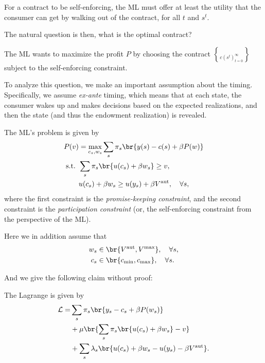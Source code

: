 For a contract to be self-enforcing, the ML must offer at least the utility that the consumer can get by walking out of the contract, for all $t$ and $s^t$.

The natural question is then, what is the optimal contract?

The ML wants to maximize the profit $P$ by choosing the contract $\brace{c(s^t)}_{t=0}^\infty$ subject to the self-enforcing constraint.

To analyze this question, we make an important assumption about the timing. Specifically, we assume \textit{ex-ante} timing, which means that at each state, the consumer wakes up and makes decisions based on the expected realizations, and then the state (and thus the endowment realization) is revealed.

The ML's problem is given by
\[
\begin{aligned}
    P(v) & = \max_{c_s,w_s} \sum_s\pi_s\br{y(s) - c(s)+\beta P(w)}\\
    \text{s.t. } & \sum_s\pi_s\br{u(c_s)+\beta w_s} \ge v,\\
    & u(c_s)+\beta w_s\ge u(y_s)+\beta V^{\text{aut}}, \quad \forall s,
\end{aligned}
\]
where the first constraint is the \textit{promise-keeping constraint}, and the second constraint is the \textit{participation constraint} (or, the self-enforcing constraint from the perspective of the ML).

Here we in addition assume that 
\[
\begin{aligned}
     w_s &\in \br{V^{\text{aut}}, V^{\max}}, \quad \forall s,\\
     c_s &\in \br{c_{\min},c_{\max}},\quad \forall s.
\end{aligned}
\]

And we give the following claim without proof:

The Lagrange is given by
\[
\begin{aligned}
    \mathcal{L} = & \sum_{s}\pi_s\br{y_s-c_s+\beta P(w_s)}\\
    & + \mu\br{\sum_s\pi_s\br{u(c_s)+\beta w_s} - v} \\
    & + \sum_s\lambda_s\br{u(c_s)+\beta w_s - u(y_s) - \beta V^{\text{aut}}}.
\end{aligned}
\]

